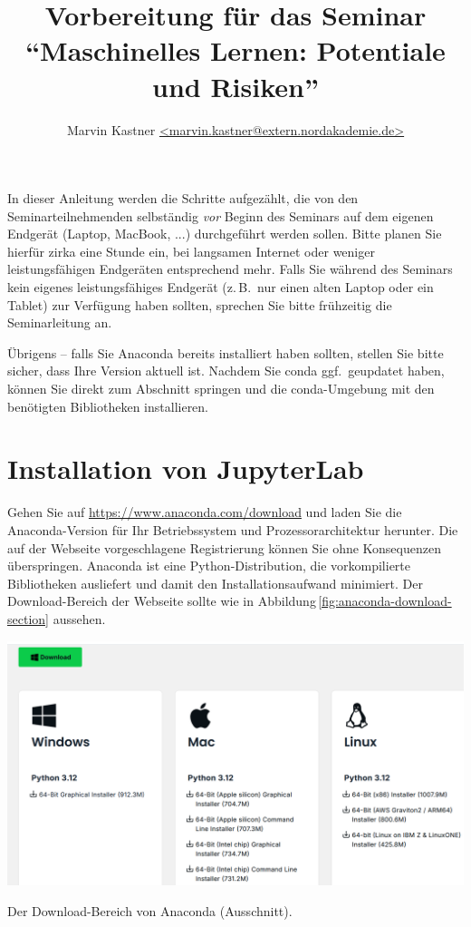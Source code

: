 \documentclass[nobib]{tufte-handout}
\title{Vorbereitung für das Seminar\\
\enquote{Maschinelles Lernen: Potentiale und Risiken}}
\author{Marvin Kastner \href{mailto:marvin.kastner@extern.nordakademie.de}{<marvin.kastner@extern.nordakademie.de>}}
\begin{document}
\maketitle%

In dieser Anleitung werden die Schritte aufgezählt, die von den Seminarteilnehmenden selbständig \emph{vor} Beginn des Seminars auf dem eigenen Endgerät (Laptop, MacBook, ...) durchgeführt werden sollen.
Bitte planen Sie hierfür zirka eine Stunde ein, bei langsamen Internet oder weniger leistungsfähigen Endgeräten entsprechend mehr.
Falls Sie während des Seminars kein eigenes leistungsfähiges Endgerät (z.\,B.\ nur einen alten Laptop oder ein Tablet) zur Verfügung haben sollten, sprechen Sie bitte frühzeitig die Seminarleitung an.

Übrigens -- falls Sie Anaconda bereits installiert haben sollten, stellen Sie bitte sicher, dass Ihre Version aktuell ist.
Nachdem Sie conda ggf.\ geupdatet haben, können Sie direkt zum Abschnitt \emph{} springen und die conda-Umgebung mit den benötigten Bibliotheken installieren.


\section{Installation von JupyterLab}

Gehen Sie auf
\url{https://www.anaconda.com/download} 
und laden Sie die Anaconda-Version für Ihr Betriebssystem und Prozessorarchitektur herunter.
Die auf der Webseite vorgeschlagene Registrierung können Sie ohne Konsequenzen überspringen.
Anaconda ist eine Python-Distribution, die vorkompilierte Bibliotheken ausliefert und damit den Installationsaufwand minimiert.
Der Download-Bereich der Webseite sollte wie in Abbildung\,\ref{fig:anaconda-download-section} aussehen.

\begin{marginfigure}
  \includegraphics{anaconda_download_section}
  \caption{Der Download-Bereich von Anaconda (Ausschnitt).}%
\label{fig:anaconda-download-section}
\end{marginfigure}
\end{document}
